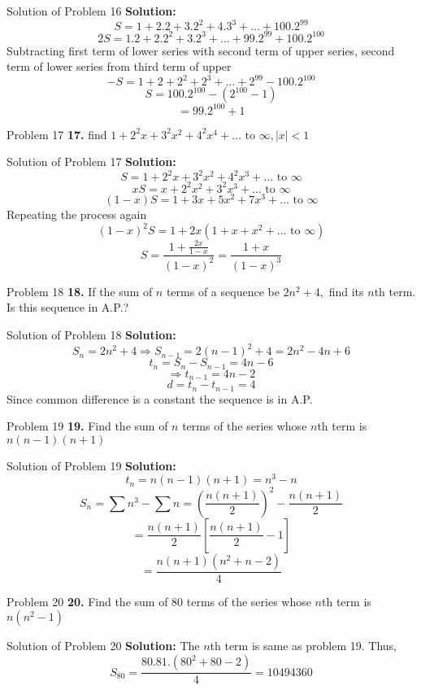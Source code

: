 \documentclass[aspectratio=1610,8pt]{beamer}
\begin{document}
\begin{frame}{Solution of Problem 16}
  \textbf{Solution:} $$S = 1 + 2.2 + 3.2^2 + 4.3^3 + \ldots + 100.2^{99}$$
  $$2S = 1.2 + 2.2^2 + 3.2^3 + \ldots + 99.2^{99} + 100.2^{100}$$
  Subtracting first term of lower series with second term of upper series, second term of lower series from third term of upper
  $$-S = 1 + 2 + 2^2 + 2^3 + \ldots + 2^{99} - 100.2^{100}$$
  $$S = 100.2^{100} - (2^{100} - 1)$$
  $$= 99.2^{100} + 1$$
\end{frame}
\begin{frame}{Problem 17}
  \textbf{17.} find $1 + 2^2x + 3^2x^2 + 4^2x^4 + \ldots \text{~to~}\infty, |x| < 1$
\end{frame}
\begin{frame}{Solution of Problem 17}
  \textbf{Solution:}$$S = 1 + 2^2x + 3^2x^2 + 4^2x^3 + \ldots \text{~to~}\infty$$
  $$xS = x + 2^2x^2 + 3^2x^3 + \ldots \text{~to~}\infty$$
  $$(1 - x)S = 1 + 3x + 5x^2 + 7x^3 + \ldots \text{~to~}\infty$$
  Repeating the process again
  $$(1 - x)^2S = 1 + 2x(1 + x + x^2 + \ldots \text{~to~}\infty)$$
  $$S = \frac{1 + \frac{2x}{1 - x}}{(1 - x)^2} = \frac{1 + x}{(1 - x)^3}$$
\end{frame}
\begin{frame}{Problem 18}
  \textbf{18.} If the sum of $n$ terms of a sequence be $2n^2 + 4,$ find its $n$th term. Is this sequence in A.P.?
\end{frame}
\begin{frame}{Solution of Problem 18}
  \textbf{Solution:}$$S_n = 2n^2 + 4 \Rightarrow S_{n - 1} = 2(n - 1)^2 + 4 = 2n^2 -4n +6$$
  $$t_n = S_n - S_{n - 1} = 4n - 6$$
  $$\Rightarrow t_{n - 1} = 4n - 2$$
  $$d = t_n - t_{n - 1} = 4$$
  Since common difference is a constant the sequence is in A.P.
\end{frame}
\begin{frame}{Problem 19}
  \textbf{19.} Find the sum of $n$ terms of the series whose $n$th term is $n(n - 1)(n + 1)$
\end{frame}
\begin{frame}{Solution of Problem 19}
  \textbf{Solution:}$$t_n = n(n - 1)(n + 1) = n^3 - n$$
  $$S_n = \sum n^3 - \sum n = \left(\frac{n(n + 1)}{2}\right)^2 - \frac{n(n + 1)}{2}$$
  $$= \frac{n(n + 1)}{2}\left[\frac{n(n + 1)}{2} - 1\right]$$
  $$= \frac{n(n + 1)(n^2 + n - 2)}{4}$$
\end{frame}
\begin{frame}{Problem 20}
  \textbf{20.} Find the sum of $80$ terms of the series whose $n$th term is $n(n^2 - 1)$
\end{frame}
\begin{frame}{Solution of Problem 20}
  \textbf{Solution:} The $n$th term is same as problem 19. Thus,
  $$S_{80} = \frac{80.81.(80^2 + 80 - 2)}{4} = 10494360$$
\end{frame}
\end{document}
